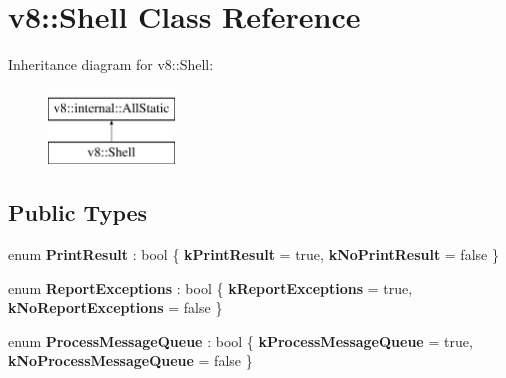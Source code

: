 \hypertarget{classv8_1_1Shell}{}\section{v8\+:\+:Shell Class Reference}
\label{classv8_1_1Shell}
Inheritance diagram for v8\+:\+:Shell\+:\begin{figure}[H]
\begin{center}
\leavevmode
\includegraphics[height=2.000000cm]{classv8_1_1Shell}
\end{center}
\end{figure}
\subsection*{Public Types}
\begin{DoxyCompactItemize}
\item 
\mbox{\label{classv8_1_1Shell_a5eb26a73b1d61be8721840a0ff25ff2c}} 
enum {\bfseries Print\+Result} \+: bool \{ {\bfseries k\+Print\+Result} = true, 
{\bfseries k\+No\+Print\+Result} = false
 \}
\item 
\mbox{\label{classv8_1_1Shell_ac566e95b4fc7a9c89378e28fb55c4a68}} 
enum {\bfseries Report\+Exceptions} \+: bool \{ {\bfseries k\+Report\+Exceptions} = true, 
{\bfseries k\+No\+Report\+Exceptions} = false
 \}
\item 
\mbox{\label{classv8_1_1Shell_a1b4803744257c8850827360e1bde6c8b}} 
enum {\bfseries Process\+Message\+Queue} \+: bool \{ {\bfseries k\+Process\+Message\+Queue} = true, 
{\bfseries k\+No\+Process\+Message\+Queue} = false
 \}
\end{DoxyCompactItemize}
